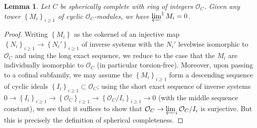 \documentclass{amsart}
\newtheorem{lemma}[theorem]{Lemma}
\theoremstyle{definition}
\begin{document}
\begin{lemma} 
\label{sphcompletelimvanishlem}
Let $C$ be spherically complete with ring of integers $\mathcal{O}_C$. 
Given any tower $\left\{M_i\right\}_{i \geq 1}$ of cyclic
$\mathcal{O}_C$-modules, we have $\varprojlim^1 M_i = 0$. 
\end{lemma} 
\begin{proof} 
Writing $\left\{M_i\right\}$ as the cokernel of an injective
map $\left\{N_i\right\}_{i \geq 1} \to \left\{N_i'\right\}_{i \geq 1}$ of
inverse systems with the
$ N_i'$ levelwise isomorphic to
$\mathcal{O}_{C}$ and using the long exact sequence, 
we reduce to the case that the $M_i$ are individually isomorphic to
$\mathcal{O}_C$ (in particular torsion-free). 
Moreover, 
upon passing to a cofinal subfamily, 
 we may assume the $\left\{M_i\right\}_{i \geq 1}$ form a descending
sequence of cyclic ideals $\left\{I_i\right\}_{i \geq 1} \subset \mathcal{O}_C$; using
the short exact sequence of inverse systems
$0 \to \left\{I_i\right\}_{i \geq 1} \to \left\{\mathcal{O}_C\right\}_{i \geq 1}
\to \left\{\mathcal{O}_C/I_i\right\}_{i \geq 1} \to 0$ (with the middle sequence
constant), we see that it suffices to show that 
$\mathcal{O}_C \to \varprojlim_i \mathcal{O}_C/I_i$ is surjective. But this is
precisely the definition of spherical completeness. 
\end{proof} 
\end{document}
